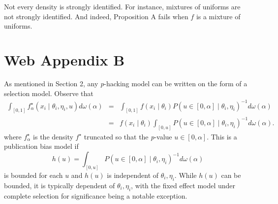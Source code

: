 Not every density is strongly identified. For instance, mixtures of uniforms are not strongly identified. And indeed, Proposition A fails when $f$ is a mixture of uniforms.

\section*{Web Appendix B}

As mentioned in Section 2, any \textit{p}-hacking model can be written on the form of a selection model. Observe that
\begin{eqnarray*}
\int_{[0,1]}f_\alpha^{\star}(x_{i}\mid\theta_{i},\eta_{i}, u)d\omega(\alpha) & = & \int_{[0,1]}f(x_{i}\mid\theta_{i})P(u\in\left[0,\alpha\right]\mid\theta_{i},\eta_{i})^{-1}d\omega(\alpha)\\
 & = & f(x_{i}\mid\theta_{i})\int_{[0,u]}P(u\in\left[0,\alpha\right]\mid\theta_{i},\eta_{i})^{-1}d\omega(\alpha).
\end{eqnarray*}
where $f_\alpha^{\star}$ is the density $f^{\star}$ truncated so that the \textit{p}-value $u\in\left[0,\alpha\right]$. This is a publication bias model if $$h(u)=\int_{[0,u]}P(u\in\left[0,\alpha\right]\mid\theta_{i},\eta_{i})^{-1}d\omega(\alpha)$$ is bounded for each $u$ and $h(u)$ is independent of $\theta_{i},\eta_{i}$. While $h(u)$ can be bounded, it is typically dependent of $\theta_{i},\eta_{i}$, with the fixed effect model under complete selection for significance being a notable exception.

